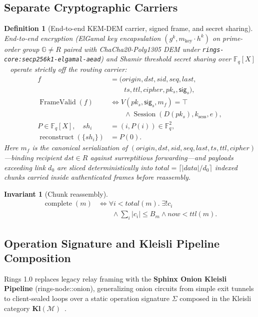 \documentclass[journal]{IEEEtran}
\newtheorem{definition}{Definition}
\newtheorem{invariant}{Invariant}
\DeclareRobustCommand{\code}[1]{{\ttfamily\renewcommand{\_}{\textunderscore\allowbreak}#1}}
\begin{document}
\subsection{Separate Cryptographic Carriers}

\begin{definition}[End-to-end KEM-DEM carrier, signed frame, and secret sharing]
End-to-end encryption (ElGamal key encapsulation $(g^k, m_{\mathrm{key}}\cdot h^k)$ on prime-order group $\mathbb{G}\neq R$ paired with \code{ChaCha20-Poly1305} DEM under \texttt{rings-core:\allowbreak secp256k1-elgamal-aead}) and Shamir threshold secret sharing over $\mathbb{F}_q[X]$~\cite{ssss} operate strictly off the routing carrier:
\[
\begin{aligned}
  f &= (origin,dst,sid,seq,last,\\
    &\qquad ts,ttl,cipher,pk_s,\mathsf{sig}_s),\\
  \operatorname{FrameValid}(f) &\iff V(pk_s,\mathsf{sig}_s,m_f)=\top\\
  &\qquad\land\operatorname{Session}(D(pk_s),k_{\mathrm{sess}},e),\\
  P\in\mathbb{F}_q[X],\quad sh_i &= (i,P(i))\in\mathbb{F}_q^2,\\
  \operatorname{reconstruct}(\{sh_i\}) &= P(0).
\end{aligned}
\]
Here $m_f$ is the canonical serialization of $(origin,dst,sid,seq,last,ts,ttl,cipher)$---binding recipient $dst\in R$ against surreptitious forwarding---and payloads exceeding link $d_0$ are sliced deterministically into $total=\lceil|data|/d_0\rceil$ indexed chunks carried inside authenticated frames before reassembly.
\end{definition}

\begin{invariant}[Chunk reassembly]
\[
\begin{aligned}
  \operatorname{complete}(m) &\iff
  \forall i<total(m).\;\exists!c_i\\
  &\qquad\land \sum_i |c_i|\leq B_m \land now<ttl(m).
\end{aligned}
\]
\end{invariant}

\subsection{Operation Signature and Kleisli Pipeline Composition}

Rings 1.0 replaces legacy relay framing with the \textbf{Sphinx Onion Kleisli
Pipeline} (\code{rings-node::onion}), generalizing onion circuits from
simple exit tunnels to client-sealed loops over a static operation signature
$\Sigma$ composed in the Kleisli category $\mathbf{Kl}(\mathcal{M})$~\cite{Danezis2009,Piotrowska2017,Hoang2015,Moggi1991,Plotkin2003,Hughes2000,Lindley2011}.
\end{document}
